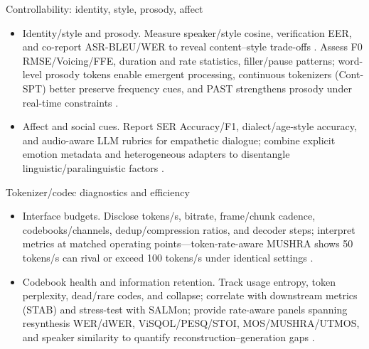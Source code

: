 \documentclass{article}
\begin{document}
Controllability: identity, style, prosody, affect
\begin{itemize}
  \item Identity/style and prosody. Measure speaker/style cosine, verification EER, and co-report ASR-BLEU/WER to reveal content--style trade-offs \cite{wang2024whydospeechlanguagemodelsfailgeneratesem,entry2025towardjointlanguagemodelingspeechunitste,jo2025lmsptalignedsemanticdistillationspeechto,entry2025indicsuperbspeechprocessinguniversalperf}. Assess F0 RMSE/Voicing/FFE, duration and rate statistics, filler/pause patterns; word-level prosody tokens enable emergent processing, continuous tokenizers (Cont-SPT) better preserve frequency cues, and PAST strengthens prosody under real-time constraints \cite{qian2025prosodylmuncoveringemergingprosodyproces,li2025continuousspeechtokenizertext,har-tuv2025pastphoneticacousticspeechtokenizer,onda2025benchmarkingprosodyencodingdiscretespeec}.
  \item Affect and social cues. Report SER Accuracy/F1, dialect/age-style accuracy, and audio-aware LLM rubrics for empathetic dialogue; combine explicit emotion metadata and heterogeneous adapters to disentangle linguistic/paralinguistic factors \cite{wang2024blspemotowardsempatheticlargespeechlangu,wang2025dualinformationspeechlanguagemodelsemoti,wang2025incorporatingcontextualparalinguisticund}.
\end{itemize}

Tokenizer/codec diagnostics and efficiency
\begin{itemize}
  \item Interface budgets. Disclose tokens/s, bitrate, frame/chunk cadence, codebooks/channels, dedup/compression ratios, and decoder steps; interpret metrics at matched operating points---token-rate-aware MUSHRA shows 50 tokens/s can rival or exceed 100 tokens/s under identical settings \cite{yang2025diffsoundstreamefficientspeechtokenizati}.
  \item Codebook health and information retention. Track usage entropy, token perplexity, dead/rare codes, and collapse; correlate with downstream metrics (STAB) and stress-test with SALMon; provide rate-aware panels spanning resynthesis WER/dWER, ViSQOL/PESQ/STOI, MOS/MUSHRA/UTMOS, and speaker similarity to quantify reconstruction--generation gaps \cite{vashishth2024stabspeechtokenizerassessmentbenchmark,maimon2025salmonsuiteacousticlanguagemodelevaluati,har-tuv2025pastphoneticacousticspeechtokenizer,wu2023speechgenunlockinggenerativepowerspeechl,wang2023slmbridgethingapbetweenspeechtextfoundat}.
\end{itemize}
\end{document}
